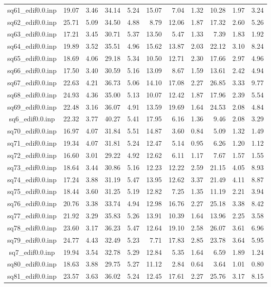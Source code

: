 {\begin{longtable}{@{}cr@{\hspace{1em}}r@{\hspace{1em}}r@{\hspace{1em}}r@{\hspace{1em}}r@{\hspace{2em}}r@{\hspace{1em}}r@{\hspace{1em}}r@{\hspace{1em}}r@{\hspace{1em}}r@{}}
sq61\_edif0.0.inp&19.07&3.46&34.14&5.24&15.07&7.04&1.32&10.28&1.97&3.24\\
sq62\_edif0.0.inp&25.71&5.09&34.50&4.88&8.79&12.06&1.87&17.32&2.60&5.26\\
sq63\_edif0.0.inp&17.21&3.45&30.71&5.37&13.50&5.47&1.33&7.39&1.83&1.92\\
sq64\_edif0.0.inp&19.89&3.52&35.51&4.96&15.62&13.87&2.03&22.12&3.10&8.24\\
sq65\_edif0.0.inp&18.69&4.06&29.18&5.34&10.50&12.71&2.30&17.66&2.97&4.96\\
sq66\_edif0.0.inp&17.50&3.40&30.59&5.16&13.09&8.67&1.59&13.61&2.42&4.94\\
sq67\_edif0.0.inp&22.63&4.21&36.73&5.06&14.10&17.08&2.27&26.85&3.33&9.77\\
sq68\_edif0.0.inp&24.93&4.36&35.00&5.13&10.07&12.42&1.87&17.96&2.39&5.54\\
sq69\_edif0.0.inp&22.48&3.16&36.07&4.91&13.59&19.69&1.64&24.53&2.08&4.84\\
sq6\_edif0.0.inp&22.32&3.77&40.27&5.41&17.95&6.16&1.36&9.46&2.08&3.29\\
sq70\_edif0.0.inp&16.97&4.07&31.84&5.51&14.87&3.60&0.84&5.09&1.32&1.49\\
sq71\_edif0.0.inp&19.34&4.07&31.81&5.24&12.47&5.14&0.95&6.26&1.20&1.12\\
sq72\_edif0.0.inp&16.60&3.01&29.22&4.92&12.62&6.11&1.17&7.67&1.57&1.55\\
sq73\_edif0.0.inp&18.64&3.44&30.86&5.16&12.23&12.22&2.59&21.15&4.05&8.93\\
sq74\_edif0.0.inp&17.24&3.88&31.19&5.47&13.95&12.62&3.37&21.49&4.11&8.87\\
sq75\_edif0.0.inp&18.44&3.60&31.25&5.19&12.82&7.25&1.35&11.19&2.21&3.94\\
sq76\_edif0.0.inp&20.76&3.38&33.74&4.94&12.98&16.76&2.27&25.18&3.38&8.42\\
sq77\_edif0.0.inp&21.92&3.29&35.83&5.26&13.91&10.39&1.64&13.96&2.25&3.58\\
sq78\_edif0.0.inp&23.60&3.17&36.23&5.47&12.64&19.10&2.58&26.07&3.61&6.96\\
sq79\_edif0.0.inp&24.77&4.43&32.49&5.23&7.71&17.83&2.85&23.78&3.64&5.95\\
sq7\_edif0.0.inp&19.94&3.54&32.78&5.29&12.84&5.35&1.64&6.59&1.89&1.24\\
sq80\_edif0.0.inp&18.63&3.88&29.75&5.27&11.12&2.84&0.64&3.64&1.01&0.80\\
sq81\_edif0.0.inp&23.57&3.63&36.02&5.24&12.45&17.61&2.27&25.76&3.17&8.15\\

\end{longtable}}
